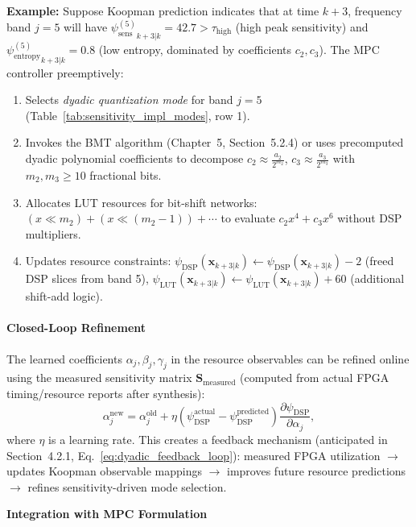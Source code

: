 \noindent\textbf{Example:} Suppose Koopman prediction indicates that at time $k+3$, frequency band $j=5$ will have ${\psi_{\text{sens}}^{(5)}}_{k+3|k} = 42.7 > \tau_{\text{high}}$ (high peak sensitivity) and ${\psi_{\text{entropy}}^{(5)}}_{k+3|k} = 0.8$ (low entropy, dominated by coefficients $c_2, c_3$). The MPC controller preemptively:
\begin{enumerate}
    \item Selects \emph{dyadic quantization mode} for band $j=5$ (Table~\ref{tab:sensitivity_impl_modes}, row 1).
    \item Invokes the BMT algorithm (Chapter~5, Section~5.2.4) or uses precomputed dyadic polynomial coefficients to decompose $c_2 \approx \frac{a_2}{2^{m_2}}$, $c_3 \approx \frac{a_3}{2^{m_3}}$ with $m_2, m_3 \geq 10$ fractional bits.
    \item Allocates LUT resources for bit-shift networks: $(x \ll m_2) + (x \ll (m_2-1)) + \cdots$ to evaluate $c_2 x^4 + c_3 x^6$ without DSP multipliers.
    \item Updates resource constraints: $\psi_{\text{DSP}}(\mathbf{x}_{k+3|k}) \gets \psi_{\text{DSP}}(\mathbf{x}_{k+3|k}) - 2$ (freed DSP slices from band 5), $\psi_{\text{LUT}}(\mathbf{x}_{k+3|k}) \gets \psi_{\text{LUT}}(\mathbf{x}_{k+3|k}) + 60$ (additional shift-add logic).
\end{enumerate}

\paragraph{Closed-Loop Refinement}

The learned coefficients $\alpha_j, \beta_j, \gamma_j$ in the resource observables can be refined online using the measured sensitivity matrix $\mathbf{S}_{\text{measured}}$ (computed from actual FPGA timing/resource reports after synthesis):
\[
\alpha_j^{\text{new}} = \alpha_j^{\text{old}} + \eta \left( \psi_{\text{DSP}}^{\text{actual}} - \psi_{\text{DSP}}^{\text{predicted}} \right) \frac{\partial \psi_{\text{DSP}}}{\partial \alpha_j},
\]
where $\eta$ is a learning rate. This creates a feedback mechanism (anticipated in Section~4.2.1, Eq.~\eqref{eq:dyadic_feedback_loop}): measured FPGA utilization $\to$ updates Koopman observable mappings $\to$ improves future resource predictions $\to$ refines sensitivity-driven mode selection.

\noindent\textbf{Integration with MPC Formulation}

